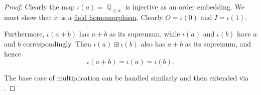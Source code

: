\begin{proof}
   Clearly the map \( \iota(a) = \BbbQ_{\leq a} \) is injective as an order embedding. We must show that it is a \hyperref[def:field/homomorphism]{field homomorphism}. Clearly \( O = \iota(0) \) and \( I = \iota(1) \).

  Furthermore, \( \iota(a + b) \) has \( a + b \) as its supremum, while \( \iota(a) \) and \( \iota(b) \) have \( a \) and \( b \) correspondingly. Then \( \iota(a) \boxplus \iota(b) \) also has \( a + b \) as its supremum, and hence
  \begin{equation*}
    \iota(a + b) = \iota(a) = \iota(b).
  \end{equation*}

  The base case of multiplication can be handled similarly and then extended via .
\end{proof}

